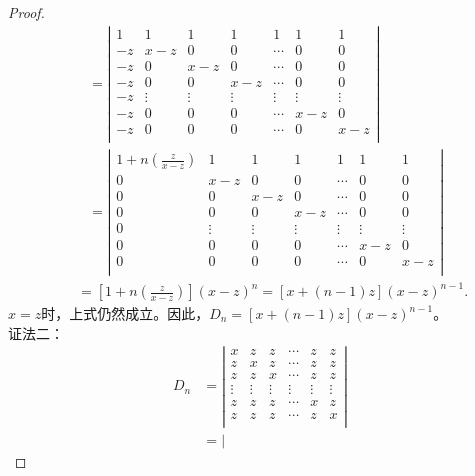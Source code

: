 \begin{enumerate}[1~]
\begin{proof}
\begin{align*}
&=\left| \begin{matrix}
	1&		1&		1&		1&		1&		1&		1\\
	-z&		x-z&		0&		0&		\cdots&		0&		0\\
	-z&		0&		x-z&		0&		\cdots&		0&		0\\
	-z&		0&		0&		x-z&		\cdots&		0&		0\\
	-z&		\vdots&		\vdots&		\vdots&		\vdots&		\vdots&		\vdots\\
	-z&		0&		0&		0&		\cdots&		x-z&		0\\
	-z&		0&		0&		0&		\cdots&		0&		x-z\\
\end{matrix} \right|\\
&=\left| \begin{matrix}
	1+n\left( \frac{z}{x-z} \right)&		1&		1&		1&		1&		1&		1\\
	0&		x-z&		0&		0&		\cdots&		0&		0\\
	0&		0&		x-z&		0&		\cdots&		0&		0\\
	0&		0&		0&		x-z&		\cdots&		0&		0\\
	0&		\vdots&		\vdots&		\vdots&		\vdots&		\vdots&		\vdots\\
	0&		0&		0&		0&		\cdots&		x-z&		0\\
	0&		0&		0&		0&		\cdots&		0&		x-z\\
\end{matrix} \right|
\end{align*}
\begin{align*}
\quad&=\left[ 1+n\left( \frac{z}{x-z} \right) \right] \left( x-z \right) ^n=\left[ x+\left( n-1 \right) z \right] \left( x-z \right) ^{n-1}.
\end{align*}
$x=z$时，上式仍然成立。因此，$D_n=\left[ x+\left( n-1 \right) z \right] \left( x-z \right) ^{n-1}$。\\
证法二：\begin{align*}
D_n
&=\left| \begin{matrix}
	x&		z&		z&		\cdots&		z&		z\\
	z&		x&		z&		\cdots&		z&		z\\
	z&		z&		x&		\cdots&		z&		z\\
	\vdots&		\vdots&		\vdots&		\vdots&		\vdots&		\vdots\\
	z&		z&		z&		\cdots&		x&		z\\
	z&		z&		z&		\cdots&		z&		x\\
\end{matrix} \right|\\
&=\left| \begin{matrix}

\end{matrix}
\end{align*}
\end{proof}
\end{enumerate}
